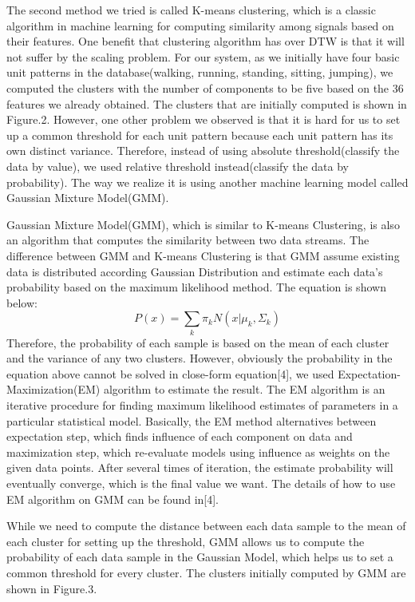 \documentclass[a4paper, 10pt, conference]{IEEEtran}      %
\begin{document}
The second method we tried is called K-means clustering, which is a classic algorithm in machine learning for computing similarity among signals based on their features. One benefit that clustering algorithm has over DTW is that it will not suffer by the scaling problem. For our system, as we initially have four basic unit patterns in the database(walking, running, standing, sitting, jumping), we computed the clusters with the number of components to be five based on the 36 features we already obtained. The clusters that are initially computed is shown in Figure.2. However, one other problem we observed is that it is hard for us to set up a common threshold for each unit pattern because each unit pattern has its own distinct variance. Therefore, instead of using absolute threshold(classify the data by value), we used relative threshold instead(classify the data by probability). The way we realize it is using another machine learning model called Gaussian Mixture Model(GMM).\par
Gaussian Mixture Model(GMM), which is similar to K-means Clustering, is also an algorithm that computes the similarity between two data streams. The difference between GMM and K-means Clustering is that GMM assume existing data is distributed according Gaussian Distribution and estimate each data's probability based on the maximum likelihood method. The equation is shown below:
\begin{equation}
P(x) = \sum_k \pi_k N(x|\mu_k,\Sigma_k)
\end{equation}
Therefore, the probability of each sample is based on the mean of each cluster and the variance of any two clusters. However, obviously the probability in the equation above cannot be solved in close-form equation[4], we used Expectation-Maximization(EM) algorithm to estimate the result. The EM algorithm is an iterative procedure for finding maximum likelihood estimates of parameters in a particular statistical model. Basically, the EM method alternatives between expectation step, which finds influence of each component on data and maximization step, which re-evaluate models using influence as weights on the given data points. After several times of iteration, the estimate probability will eventually converge, which is the final value we want. The details of how to use EM algorithm on GMM can be found in[4].\par
While we need to compute the distance between each data sample to the mean of each cluster for setting up the threshold, GMM allows us to compute the probability of each data sample in the Gaussian Model, which helps us to set a common threshold for every cluster. The clusters initially computed by GMM are shown in Figure.3. \par
\end{document}
